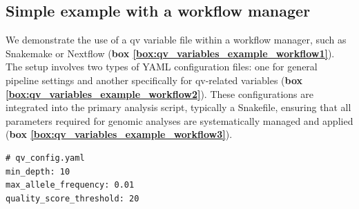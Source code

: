 \begin{tcolorbox}[
    breakable,  %
    colback=white!0,  %
    colframe=black,  %
    boxrule=1pt,  %
    arc=1mm,  %
    outer arc=1mm,
    title=\textbf{\refstepcounter{myboxcounter}\label{box:qv_bash_code_example}Box \themyboxcounter: Example code sourcing the variables file}
]


\end{tcolorbox}

\subsection{Simple example with a workflow manager}
We demonstrate the use of a \ac{qv} variable file within a workflow manager, such as Snakemake or Nextflow
(\textbf{box \ref{box:qv_variables_example_workflow1}}).
The setup involves two types of YAML configuration files: one for general pipeline settings and another specifically for \ac{qv}-related variables
(\textbf{box \ref{box:qv_variables_example_workflow2}}).
These configurations are integrated into the primary analysis script, typically a Snakefile, ensuring that all parameters required for genomic analyses are systematically managed and applied 
(\textbf{box \ref{box:qv_variables_example_workflow3}}). 

\begin{tcolorbox}[
    breakable,  %
    colback=white!0,  %
    colframe=black,  %
    boxrule=1pt,  %
    arc=1mm,  %
    outer arc=1mm,
     title=\textbf{\refstepcounter{myboxcounter}\label{box:qv_variables_example_workflow1}Box \themyboxcounter: Example worflow manager - yaml}
]

\begin{verbatim}
# qv_config.yaml
min_depth: 10
max_allele_frequency: 0.01
quality_score_threshold: 20
\end{verbatim}
\end{tcolorbox}

